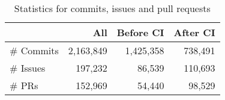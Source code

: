 \begin{table}[t]
	\centering
	\caption{Statistics for commits, issues and pull requests}
	\vspace{-0.2cm}
	\label{count_info}
	\begin{tabular}{lrrr}
		\hline
		& All     & Before CI & After CI \\ \hline
		\# Commits & 2,163,849 & 1,425,358   & 738,491   \\ \hline
		\# Issues  & 197,232  & 86,539     & 110,693   \\ \hline
		\# PRs      & 152,969  & 54,440     & 98,529    \\ \hline
	\end{tabular}
\end{table}




